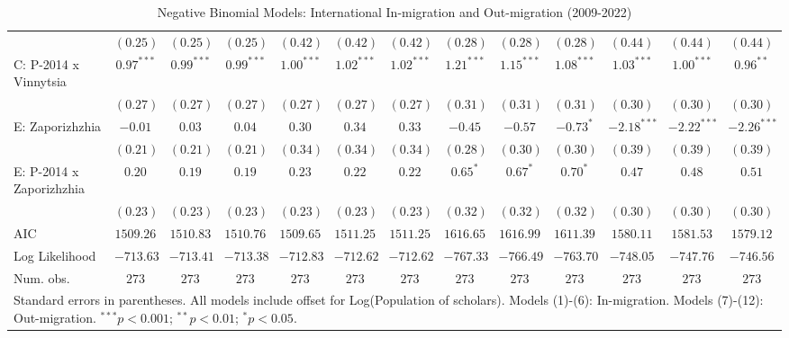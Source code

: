 \begin{table}
\begin{center}
\begin{tiny}
\begin{tabular}{l c c c c c c c c c c c c}
                            & $(0.25)$      & $(0.25)$      & $(0.25)$      & $(0.42)$     & $(0.42)$     & $(0.42)$     & $(0.28)$      & $(0.28)$     & $(0.28)$       & $(0.44)$      & $(0.44)$      & $(0.44)$      \\
C: P-2014 x Vinnytsia       & $0.97^{***}$  & $0.99^{***}$  & $0.99^{***}$  & $1.00^{***}$ & $1.02^{***}$ & $1.02^{***}$ & $1.21^{***}$  & $1.15^{***}$ & $1.08^{***}$   & $1.03^{***}$  & $1.00^{***}$  & $0.96^{**}$   \\
                            & $(0.27)$      & $(0.27)$      & $(0.27)$      & $(0.27)$     & $(0.27)$     & $(0.27)$     & $(0.31)$      & $(0.31)$     & $(0.31)$       & $(0.30)$      & $(0.30)$      & $(0.30)$      \\
E: Zaporizhzhia             & $-0.01$       & $0.03$        & $0.04$        & $0.30$       & $0.34$       & $0.33$       & $-0.45$       & $-0.57$      & $-0.73^{*}$    & $-2.18^{***}$ & $-2.22^{***}$ & $-2.26^{***}$ \\
                            & $(0.21)$      & $(0.21)$      & $(0.21)$      & $(0.34)$     & $(0.34)$     & $(0.34)$     & $(0.28)$      & $(0.30)$     & $(0.30)$       & $(0.39)$      & $(0.39)$      & $(0.39)$      \\
E: P-2014 x Zaporizhzhia    & $0.20$        & $0.19$        & $0.19$        & $0.23$       & $0.22$       & $0.22$       & $0.65^{*}$    & $0.67^{*}$   & $0.70^{*}$     & $0.47$        & $0.48$        & $0.51$        \\
                            & $(0.23)$      & $(0.23)$      & $(0.23)$      & $(0.23)$     & $(0.23)$     & $(0.23)$     & $(0.32)$      & $(0.32)$     & $(0.32)$       & $(0.30)$      & $(0.30)$      & $(0.30)$      \\
\hline
AIC                         & $1509.26$     & $1510.83$     & $1510.76$     & $1509.65$    & $1511.25$    & $1511.25$    & $1616.65$     & $1616.99$    & $1611.39$      & $1580.11$     & $1581.53$     & $1579.12$     \\
Log Likelihood              & $-713.63$     & $-713.41$     & $-713.38$     & $-712.83$    & $-712.62$    & $-712.62$    & $-767.33$     & $-766.49$    & $-763.70$      & $-748.05$     & $-747.76$     & $-746.56$     \\
Num. obs.                   & $273$         & $273$         & $273$         & $273$        & $273$        & $273$        & $273$         & $273$        & $273$          & $273$         & $273$         & $273$         \\
\hline
\multicolumn{13}{l}{\tiny{Standard errors in parentheses. All models include offset for Log(Population of scholars). Models (1)-(6): In-migration. Models (7)-(12): Out-migration. $^{***}p<0.001$; $^{**}p<0.01$; $^{*}p<0.05$.}}
\end{tabular}
\end{tiny}
\caption{Negative Binomial Models: International In-migration and Out-migration (2009-2022)}
\label{tab:combined_migration}
\end{center}
\end{table}
